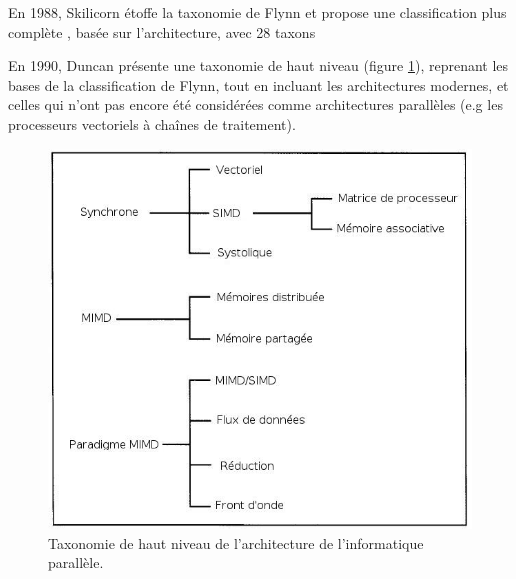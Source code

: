 \documentclass[a4paper,12pt]{report}
\theoremstyle{plain}				%
\theoremstyle{definition}				%
\newcommand{\lp}[1]{\todo[author=LP,color=yellow,inline]{#1}}
\newcommand{\fco}[1]{\todo[author=FCO,color=blue,inline]{#1}}
\begin{document}
En 1988, Skilicorn étoffe la taxonomie de Flynn et propose une
classification plus complète \cite{86786}, basée sur l'architecture,
avec 28 taxons

En 1990, Duncan présente une taxonomie de haut niveau \cite{44900}
(figure \ref{fig:TaxonomieHautNiveau}),
reprenant les bases de la classification de Flynn, tout en incluant
les architectures modernes, et celles qui n'ont pas encore été
considérées comme architectures parallèles (e.g les processeurs
vectoriels à chaînes de traitement).

\begin{figure}
\includegraphics[width=\columnwidth]{Biblio_PCmax_Rendu_Taxonomie_Duncan.jpg}
\caption{Taxonomie de haut niveau de l'architecture de l'informatique parallèle.}
\label{fig:TaxonomieHautNiveau}
\end{figure}
\end{document}

